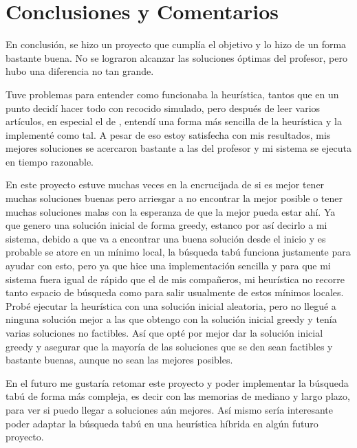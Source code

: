 \documentclass{article}
\begin{document}
\section{Conclusiones y Comentarios}

En conclusión, se hizo un proyecto que cumplía el objetivo y lo hizo de un forma bastante buena. No se lograron alcanzar las soluciones óptimas del profesor, pero hubo una diferencia no tan grande.

Tuve problemas para entender como funcionaba la heurística, tantos que en un punto decidí hacer todo con recocido simulado, pero después de leer varios artículos, en especial el de \cite{clever}, entendí una forma más sencilla de la heurística y la implementé como tal. A pesar de eso estoy satisfecha con mis resultados, mis mejores soluciones se acercaron bastante a las del profesor y mi sistema se ejecuta en tiempo razonable.

En este proyecto estuve muchas veces en la encrucijada de si es mejor tener muchas soluciones buenas pero arriesgar a no encontrar la mejor posible o tener muchas soluciones malas con la esperanza de que la mejor pueda estar ahí. Ya que genero una solución inicial de forma greedy, estanco por así decirlo a mi sistema, debido a que va a encontrar una buena solución desde el inicio y es probable se atore en un mínimo local, la búsqueda tabú funciona justamente para ayudar con esto, pero ya que hice una implementación sencilla y para que mi sistema fuera igual de rápido que el de mis compañeros, mi heurística no recorre tanto espacio de búsqueda como para salir usualmente de estos mínimos locales. Probé ejecutar la heurística con una solución inicial aleatoria, pero no llegué a ninguna solución mejor a las que obtengo con la solución inicial greedy y tenía varias soluciones no factibles. Así que opté por mejor dar la solución inicial greedy y asegurar que la mayoría de las soluciones que se den sean factibles y bastante buenas, aunque no sean las mejores posibles.

En el futuro me gustaría retomar este proyecto y poder implementar la búsqueda tabú de forma más compleja, es decir con las memorias de mediano y largo plazo, para ver si puedo llegar a soluciones aún mejores. Así mismo sería interesante poder adaptar la búsqueda tabú en una heurística híbrida en algún futuro proyecto.
\end{document}
